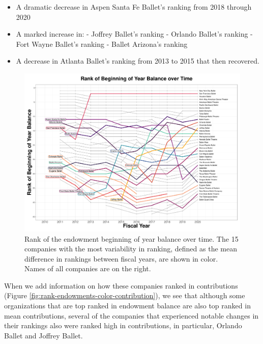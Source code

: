 \documentclass[Dance Data
Project,article,submit,moreauthors,pdftex]{mdpi}
\begin{document}
\begin{itemize}
\item A dramatic decrease in Aspen Santa Fe Ballet’s ranking from 2018 through 2020
\item A marked increase in: 
\subitem - Joffrey Ballet’s ranking
\subitem - Orlando Ballet’s ranking
\subitem - Fort Wayne Ballet’s ranking
\subitem - Ballet Arizona’s ranking
\item A decrease in Atlanta Ballet’s ranking from 2013 to 2015 that then recovered.
\end{itemize}

\begin{figure}[H]
\includegraphics[width=0.9\linewidth,]{../images/rank_of_beginning_year_balance} \caption{\label{fig:rank-endowments}Rank of the endowment beginning of year balance over time. The 15 companies with the most variability in ranking, defined as the mean difference in rankings between fiscal years, are shown in color. Names of all companies are on the right.}\label{fig:rank-og-beginning-year-balance}
\end{figure}

When we add information on how these companies ranked in contributions
(Figure \ref{fig:rank-endowments-color-contribution}), we see that
although some organizations that are top ranked in endowment balance are
also top ranked in mean contributions, several of the companies that
experienced notable changes in their rankings also were ranked high in
contributions, in particular, Orlando Ballet and Joffrey Ballet.
\end{document}

